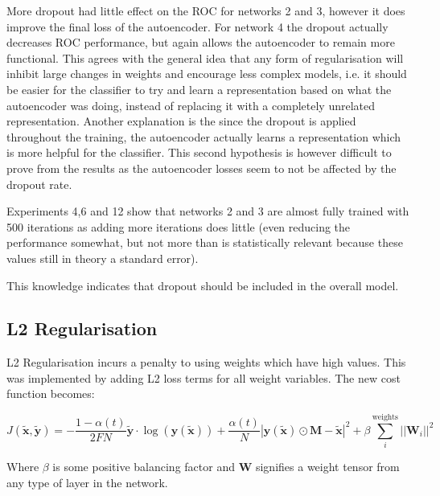       More dropout had little effect on the ROC for networks 2 and 3, however it does
      improve the final loss of the autoencoder. For network 4 the dropout actually decreases
      ROC performance, but again allows the autoencoder to remain more functional. This
      agrees with the general idea that any form of regularisation will inhibit large changes
      in weights and encourage less complex models, i.e. it should be easier for the classifier to try and learn
      a representation based on what the autoencoder was doing, instead of replacing it with a completely unrelated
      representation. Another explanation is the since the dropout is applied throughout the training, the autoencoder
      actually learns a representation which is more helpful for the classifier. This second hypothesis is
      however difficult to prove from the results as the autoencoder losses seem to not be affected by the dropout rate.

      Experiments 4,6 and 12 show that networks 2 and 3 are almost fully trained
      with 500 iterations as adding more iterations does little (even reducing the performance somewhat, but not more than is statistically relevant because
      these values still in theory a standard error).

      This knowledge indicates that dropout should be included in the overall model.


      \newpage
    \subsection{L2 Regularisation}
      L2 Regularisation incurs a penalty to using weights which have high values. This was implemented by adding L2
      loss terms for all weight variables. The new cost function becomes:

      \begin{equation} \label{eq:l2_cost_model}
          J(\tilde{\mathbf{x}},\tilde{\mathbf{y}}) = -\frac{1-\alpha(t)}{2FN}\tilde{\mathbf{y}}\cdot\log(\mathbf{y}(\tilde{\mathbf{x}}))
          + \frac{\alpha(t)}{N}\left |\mathbf{y}(\tilde{\mathbf{x}}) \odot \mathbf{M}-\tilde{\mathbf{x}}\right | ^2
          + \beta \sum_i^{\text{weights}}||\mathbf{W}_i||^2
      \end{equation}

      Where $\beta$ is some positive balancing factor and $\mathbf{W}$ signifies
      a weight tensor from any type of layer in the network.

